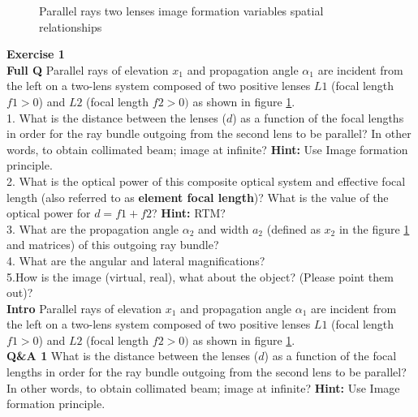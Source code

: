 \documentclass[main.tex]{subfiles}
\begin{document}
\begin{figure}
\centering{}
\caption{Parallel rays two lenses image formation variables spatial relationships}
\label{fig:2_1}
\end{figure}

\textbf{Exercise 1}\\

\textbf{Full Q} Parallel rays of elevation $x_1$ and propagation angle $\alpha_1$ are incident from the left on a two-lens system composed of two positive lenses $L1$ (focal length $f1>0$) and $L2$ (focal length $f2 >0)$ as shown in figure \ref{fig:2_1}.\\
1. What is the distance between the lenses ($d$) as a function of the focal lengths in order for the ray bundle outgoing from the second lens to be parallel? In other words, to obtain collimated beam; image at infinite? \textbf{Hint:} Use Image formation principle.\\
2. What is the optical power of this composite optical system and effective focal length (also referred to as \textbf{element focal length})? What is the value of the optical power for $d=f1+f2$? \textbf{Hint:} RTM?\\
3. What are the propagation angle $\alpha_2$ and width $a_2$ (defined as $x_2$ in the figure \ref{fig:2_1} and matrices) of this outgoing ray bundle? \\
4. What are the angular and lateral magnifications?\\
5.How is the image (virtual, real), what about the object? (Please point them out)?\\


\textbf{Intro} Parallel rays of elevation $x_1$ and propagation angle $\alpha_1$ are incident from the left on a two-lens system composed of two positive lenses $L1$ (focal length $f1>0$) and $L2$ (focal length $f2 >0)$ as shown in figure \ref{fig:2_1}.\\

\textbf{Q\&A 1} What is the distance between the lenses ($d$) as a function of the focal lengths in order for the ray bundle outgoing from the second lens to be parallel? In other words, to obtain collimated beam; image at infinite? \textbf{Hint:} Use Image formation principle.\\
\end{document}
